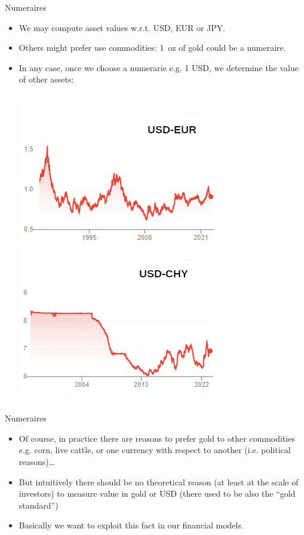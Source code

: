 \documentclass{beamer}
\begin{document}
\begin{frame}{Numeraires}
  \begin{itemize}
  \item We may compute asset values w.r.t. USD, EUR or JPY.
  \item Others might prefer use commodities: 1~oz of gold could be a numeraire.
  \item In any case, once we choose a numerarie e.g. 1 USD, we determine the value of other assets:
    \begin{columns}
      \includegraphics[width=0.9\linewidth]{usd_eur}
      \includegraphics[width=0.9\linewidth]{usd_chy}
    \end{columns}
  \end{itemize}
\end{frame}

\begin{frame}{Numeraires}
  \begin{itemize}
  \item Of course, in practice there are reasons to prefer gold to other commodities e.g. corn, live cattle, or one currency with respect to another (i.e. political reasons)\ldots
  \item But intuitively there should be no theoretical reason (at least at the scale of investors) to measure value in gold or USD (there used to be also the ``gold standard'')
  \item Basically we want to exploit this fact in our financial models.
  \end{itemize}
\end{frame}
\end{document}
